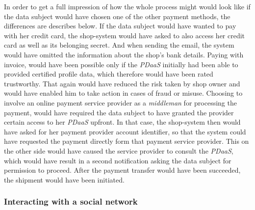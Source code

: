 \documentclass[12pt,english,a4paper,titlepage,cleardoublepage=empty,dottedtoc]{report}
\begin{document}
In order to get a full impression of how the whole process might would
look like if the data subject would have chosen one of the other payment
methods, the differences are describes below. If the data subject would
have wanted to pay with her credit card, the shop-system would have
asked to also access her credit card as well as its belonging secret.
And when sending the email, the system would have omitted the
information about the shop's bank details. Paying with invoice, would
have been possible only if the \emph{PDaaS} initially had been able to
provided certified profile data, which therefore would have been rated
trustworthy. That again would have reduced the risk taken by shop owner
and would have enabled him to take action in cases of fraud or misuse.
Choosing to involve an online payment service provider as a
\emph{middleman} for processing the payment, would have required the
data subject to have granted the provider certain access to her
\emph{PDaaS} upfront. In that case, the shop-system then would have
asked for her payment provider account identifier, so that the system
could have requested the payment directly form that payment service
provider. This on the other side would have caused the service provider
to consult the \emph{PDaaS}, which would have result in a second
notification asking the data subject for permission to proceed. After
the payment transfer would have been succeeded, the shipment would have
been initiated.

\subsubsection{Interacting with a social
network}\label{interacting-with-a-social-network}
\end{document}
